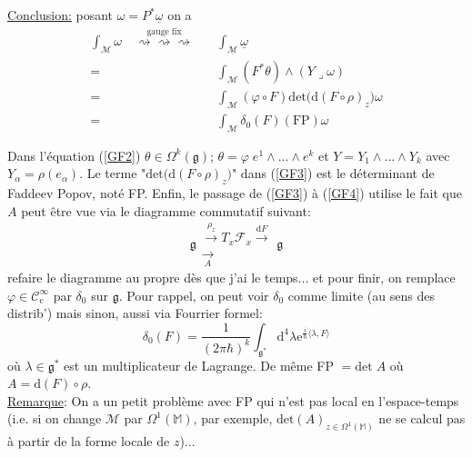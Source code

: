 \documentclass[a4paper,11pt]{article}
\renewcommand{\d}{{\mathrm{d}}}
\newcommand{\e}{{\mathrm{e}}}
\begin{document}
\noindent \underline{Conclusion:} posant $\omega = P^* \underline{\omega}$ on a
\begin{align}
\int_\mathcal{M} \omega \quad \overset{\mathrm{gauge}\;\mathrm{fix}}{\rightsquigarrow\rightsquigarrow\rightsquigarrow}
\quad & \int_{\underline{\mathcal{M}}} \underline{\omega}\\
=& \int_\mathcal{M} (F^* \theta) \wedge (Y\lrcorner \omega)\label{GF2}\\
=& \int_\mathcal{M} (\varphi\circ F) \mathrm{det} \Big( \d (F\circ\rho)_z\Big) \omega\label{GF3}\\
=& \int_\mathcal{M} \delta_0 (F) (\mathrm{FP}) \omega \label{GF4}
\end{align}

Dans l'équation (\ref{GF2}) $\theta \in \Omega^k(\mathfrak{g})$; $\theta=\varphi\; e^1\wedge...\wedge e^k$ et $Y= Y_1 \wedge ... \wedge Y_k$ avec $Y_\alpha = \rho(e_\alpha)$. Le terme "$\mathrm{det} \Big(\d (F\circ\rho)_z\Big)$" dans (\ref{GF3}) est le déterminant de Faddeev Popov, noté FP. Enfin, le passage de (\ref{GF3}) à (\ref{GF4}) utilise le fait que $A$ peut être vue via le diagramme commutatif suivant:
$$\mathfrak{g}
\begin{matrix}
\overset{\rho_z}\to T_x\mathcal{F}_x \overset{\d F} \to \\
\underset A \longrightarrow
\end{matrix}
\mathfrak{g}$$
\color{red} refaire le diagramme au propre dès que j'ai le temps...\color{black} et pour finir, on remplace $\varphi \in \mathcal{C}^\infty_\mathrm{c}$ par $\delta_0$ sur $\mathfrak{g}$. Pour rappel, on peut voir $\delta_0$ comme limite (au sens des distrib') mais sinon, aussi via Fourrier formel:
$$\delta_0(F) = \frac{1}{(2\pi\hbar)^k}\int_{\mathfrak{g}^*} \d^4\lambda \e^{\frac{i}{\hbar}\langle\lambda,F\rangle}$$
où $\lambda \in \mathfrak{g}^*$ est un multiplicateur de Lagrange. De même FP $= \mathrm{det} \; A$ où $A=\d (F)\circ \rho$.\\

\underline{Remarque}: On a un petit problème avec FP qui n'est pas local en l'espace-temps (i.e. si on change $\mathcal M$ par $\Omega^1(\mathbb M)$, par exemple, $\mathrm{det}(A)_{z\in\Omega^1(\mathbb M)}$ ne se calcul pas à partir de la forme locale de $z$)...
\end{document}
